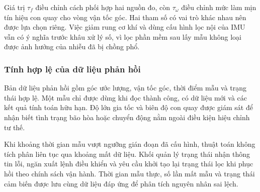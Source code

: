 Giá trị $\tau_f$ điều chỉnh cách phối hợp hai nguồn đo, còn $\tau_\omega$ điều chỉnh mức làm mịn tín hiệu con quay cho vòng vận tốc góc. Hai tham số có vai trò khác nhau nên được lựa chọn riêng. Việc giảm rung cơ khí và dùng cấu hình lọc nội của IMU vẫn có ý nghĩa trước khâu xử lý số, vì lọc phần mềm sau lấy mẫu không loại được ảnh hưởng của nhiễu đã bị chồng phổ.

\subsubsection{Tính hợp lệ của dữ liệu phản hồi}

Bản dữ liệu phản hồi gồm góc ước lượng, vận tốc góc, thời điểm mẫu và trạng thái hợp lệ. Một mẫu chỉ được dùng khi đọc thành công, có dữ liệu mới và các kết quả tính toán hữu hạn. Độ lớn gia tốc và biên độ con quay được giám sát để nhận biết tình trạng bão hòa hoặc chuyển động nằm ngoài điều kiện hiệu chỉnh tư thế.

Khi khoảng thời gian mẫu vượt ngưỡng gián đoạn đã cấu hình, thuật toán không tích phân liên tục qua khoảng mất dữ liệu. Khối quản lý trạng thái nhận thông tin lỗi, ngăn xuất lệnh điều khiển và yêu cầu khởi tạo lại trạng thái lọc khi phục hồi theo chính sách vận hành. Thời gian mẫu thực, số lần mất mẫu và trạng thái cảm biến được lưu cùng dữ liệu đáp ứng để phân tích nguyên nhân sai lệch.

